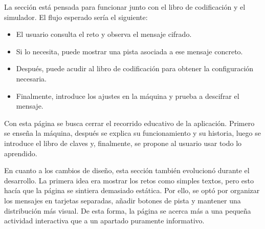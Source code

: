 La sección está pensada para funcionar junto con el libro de codificación y el simulador. El flujo esperado sería el siguiente:

\begin{itemize}
	\item El usuario consulta el reto y observa el mensaje cifrado.
	\item Si lo necesita, puede mostrar una pista asociada a ese mensaje concreto.
	\item Después, puede acudir al libro de codificación para obtener la configuración necesaria.
	\item Finalmente, introduce los ajustes en la máquina y prueba a descifrar el mensaje.
\end{itemize}

Con esta página se busca cerrar el recorrido educativo de la aplicación. Primero se enseña la máquina, después se explica su funcionamiento y su historia, luego se introduce el libro de claves y, finalmente, se propone al usuario usar todo lo aprendido.

En cuanto a los cambios de diseño, esta sección también evolucionó durante el desarrollo. La primera idea era mostrar los retos como simples textos, pero esto hacía que la página se sintiera demasiado estática. Por ello, se optó por organizar los mensajes en tarjetas separadas, añadir botones de pista y mantener una distribución más visual. De esta forma, la página se acerca más a una pequeña actividad interactiva que a un apartado puramente informativo.